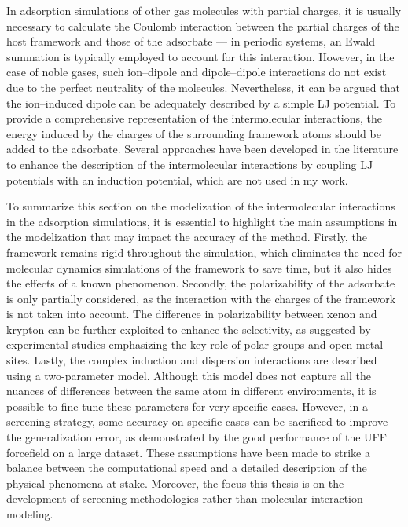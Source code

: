 \documentclass[main.tex]{subfiles}
\begin{document}
In adsorption simulations of other gas molecules with partial charges, it is usually necessary to calculate the Coulomb interaction between the partial charges of the host framework and those of the adsorbate --- in periodic systems, an Ewald summation is typically employed to account for this interaction. However, in the case of noble gases, such ion--dipole and dipole--dipole interactions do not exist due to the perfect neutrality of the molecules. Nevertheless, it can be argued that the ion--induced dipole can be adequately described by a simple LJ potential. To provide a comprehensive representation of the intermolecular interactions, the energy induced by the charges of the surrounding framework atoms should be added to the adsorbate. Several approaches have been developed in the literature to enhance the description of the intermolecular interactions by coupling LJ potentials with an induction potential,\autocite{Lachet_1998,Becker_2017} which are not used in my work.

To summarize this section on the modelization of the intermolecular interactions in the adsorption simulations, it is essential to highlight the main assumptions in the modelization that may impact the accuracy of the method. Firstly, the framework remains rigid throughout the simulation, which eliminates the need for molecular dynamics simulations of the framework to save time, but it also hides the effects of a known phenomenon.\autocite{Witman_2017} Secondly, the polarizability of the adsorbate is only partially considered, as the interaction with the charges of the framework is not taken into account. The difference in polarizability between xenon and krypton can be further exploited to enhance the selectivity, as suggested by experimental studies emphasizing the key role of polar groups and open metal sites.\autocite{Li_2019,Pei_2022,Perry_2014} Lastly, the complex induction and dispersion interactions are described using a two-parameter model. Although this model does not capture all the nuances of differences between the same atom in different environments, it is possible to fine-tune these parameters for very specific cases. However, in a screening strategy, some accuracy on specific cases can be sacrificed to improve the generalization error, as demonstrated by the good performance of the UFF forcefield on a large dataset.\autocite{McDaniel_2015}
These assumptions have been made to strike a balance between the computational speed and a detailed description of the physical phenomena at stake. Moreover, the focus this thesis is on the development of screening methodologies rather than molecular interaction modeling.
\end{document}

